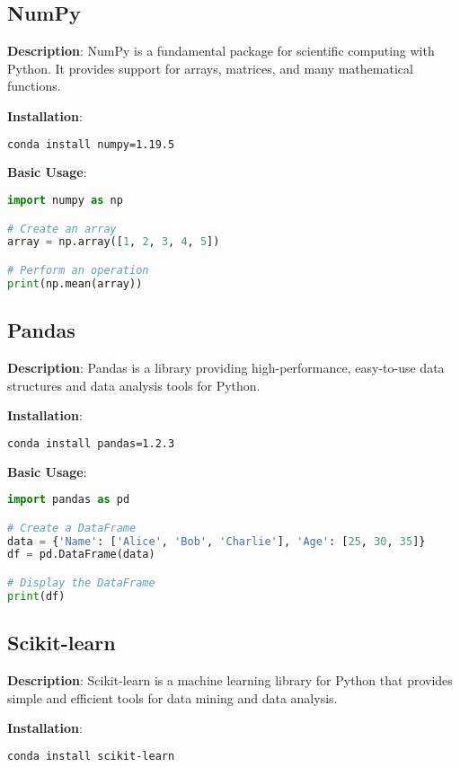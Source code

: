 \documentclass{article}
\begin{document}
\subsection{NumPy}
\textbf{Description}: NumPy is a fundamental package for scientific computing with Python. It provides support for arrays, matrices, and many mathematical functions.

\textbf{Installation}:
\begin{lstlisting}[language=bash]
conda install numpy=1.19.5
\end{lstlisting}

\textbf{Basic Usage}:
\begin{lstlisting}[language=python]
import numpy as np

# Create an array
array = np.array([1, 2, 3, 4, 5])

# Perform an operation
print(np.mean(array))
\end{lstlisting}

\subsection{Pandas}
\textbf{Description}: Pandas is a library providing high-performance, easy-to-use data structures and data analysis tools for Python.

\textbf{Installation}:
\begin{lstlisting}[language=bash]
conda install pandas=1.2.3
\end{lstlisting}

\textbf{Basic Usage}:
\begin{lstlisting}[language=python]
import pandas as pd

# Create a DataFrame
data = {'Name': ['Alice', 'Bob', 'Charlie'], 'Age': [25, 30, 35]}
df = pd.DataFrame(data)

# Display the DataFrame
print(df)
\end{lstlisting}

\subsection{Scikit-learn}
\textbf{Description}: Scikit-learn is a machine learning library for Python that provides simple and efficient tools for data mining and data analysis.

\textbf{Installation}:
\begin{lstlisting}[language=bash]
conda install scikit-learn
\end{lstlisting}
\end{document}
